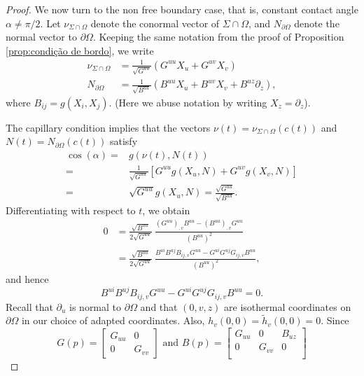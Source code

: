 \documentclass[11pt,reqno]{amsart}
\begin{document}
\begin{proof}
We now turn to the non free boundary case, that is, constant contact angle $\alpha\neq \pi/2$. Let $\nu_{\Sigma\cap \Omega}$ denote the conormal vector of $\Sigma\cap\Omega$, and $N_{\partial\Omega}$ denote the normal vector to $\partial\Omega$. Keeping the same notation from the proof of Proposition \ref{prop:condição de bordo}, we write
    \begin{align*}
        \nu_{\Sigma\cap \Omega}& =\frac{1}{\sqrt{G^{uu}}}(G^{uu}X_u+G^{uv}X_v) \\
        N_{\partial \Omega}& =\frac{1}{\sqrt{B^{uu}}}(B^{uu}X_u+B^{uv}X_v+B^{uz}\partial_z),
    \end{align*}
where $B_{ij}=g(X_i,X_j)$. (Here we abuse notation by writing $X_z=\partial_z$).

The capillary condition implies that the vectors $\nu(t)=\nu_{\Sigma\cap\Omega}(c(t))$ and $N(t)=N_{\partial \Omega}(c(t))$ satisfy
\begin{align*}
    \cos(\alpha) = & g(\nu(t),N(t)) \\
    = & \frac{1}{\sqrt{G^{uu}}}[G^{uu}g(X_u,N)+G^{uv}g(X_v,N)] \\
    = & \sqrt{G^{uu}}g(X_u,N)= \frac{\sqrt{G^{uu}}}{\sqrt{B^{uu}}}.
\end{align*}
Differentiating with respect to $t$, we obtain
\begin{align*}
    0 & = \frac{\sqrt{B^{uu}}}{2\sqrt{G^{uu}}}
    \ \frac{(G^{uu})_{,v}B^{uu}-(B^{uu})_{,v}G^{uu}}{(B^{uu})^2} \\
    & = \frac{\sqrt{B^{uu}}}{2\sqrt{G^{uu}}}\ \frac{B^{ui}B^{uj}B_{ij,v}G^{uu}-G^{ui}G^{uj}G_{ij,v}B^{uu}}{(B^{uu})^2},
\end{align*}
and hence
\begin{equation}\label{eq:derivada ao longo de c}
B^{ui}B^{uj}B_{ij,v}G^{uu}-G^{ui}G^{uj}G_{ij,v}B^{uu} = 0.
\end{equation}
Recall that $\partial_u$ is normal to $\partial\Omega$ and that $(0,v,z)$ are isothermal coordinates on $\partial\Omega$ in our choice of adapted coordinates. Also, $h_v(0,0)=\widetilde{h}_v(0,0)=0$. Since
\begin{equation*}    
    G(p)=\begin{bmatrix}
            G_{uu} & 0 \\
            0 & G_{vv}
        \end{bmatrix} \text{ and }
    B(p)=\begin{bmatrix}
            G_{uu} & 0 & B_{uz} \\
            0 & G_{vv} & 0 \\

\end{bmatrix}
\end{equation*}
\end{proof}
\end{document}
